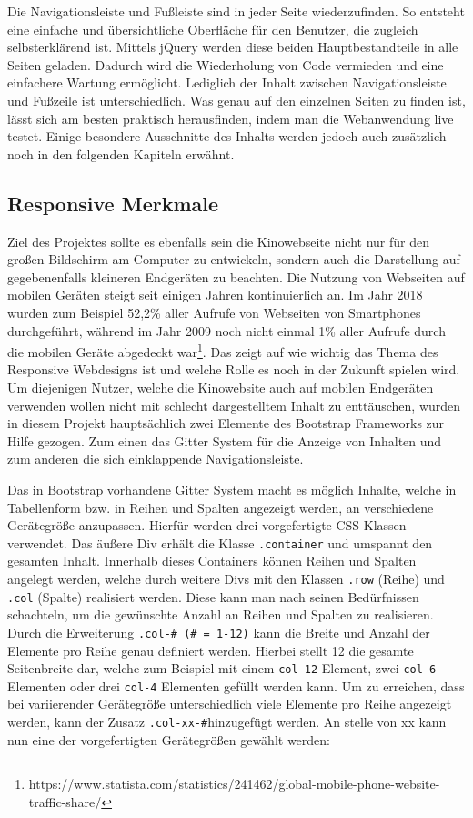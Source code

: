 	    
	    Die Navigationsleiste und Fußleiste sind in jeder Seite wiederzufinden. So entsteht eine einfache und übersichtliche Oberfläche für den Benutzer, die zugleich selbsterklärend ist. Mittels jQuery werden diese beiden Hauptbestandteile in alle Seiten geladen. Dadurch wird die Wiederholung von Code vermieden und eine einfachere Wartung ermöglicht. Lediglich der Inhalt zwischen Navigationsleiste und Fußzeile ist unterschiedlich. Was genau auf den einzelnen Seiten zu finden ist, lässt sich am besten praktisch herausfinden, indem man die Webanwendung live testet. Einige besondere Ausschnitte des Inhalts werden jedoch auch zusätzlich noch in den folgenden Kapiteln erwähnt. 
	
	
	\subsection{Responsive Merkmale}
	Ziel des Projektes sollte es ebenfalls sein die Kinowebseite nicht nur für den großen Bildschirm am Computer zu entwickeln, sondern auch die Darstellung auf gegebenenfalls kleineren Endgeräten zu beachten. Die Nutzung von Webseiten auf mobilen Geräten steigt seit einigen Jahren kontinuierlich an. Im Jahr 2018 wurden zum Beispiel 52,2\% aller Aufrufe von Webseiten von Smartphones durchgeführt, während im Jahr 2009 noch nicht einmal 1\% aller Aufrufe durch die mobilen Geräte abgedeckt war\footnote{https://www.statista.com/statistics/241462/global-mobile-phone-website-traffic-share/}. Das zeigt auf wie wichtig das Thema des Responsive Webdesigns ist und welche Rolle es noch in der Zukunft spielen wird. Um diejenigen Nutzer, welche die Kinowebsite auch auf mobilen Endgeräten verwenden wollen nicht mit schlecht dargestelltem Inhalt zu enttäuschen, wurden in diesem Projekt hauptsächlich zwei Elemente des Bootstrap Frameworks zur Hilfe gezogen. Zum einen das Gitter System für die Anzeige von Inhalten und zum anderen die sich einklappende Navigationsleiste.
	
	Das in Bootstrap vorhandene Gitter System macht es möglich Inhalte, welche in Tabellenform bzw. in Reihen und Spalten angezeigt werden, an verschiedene Gerätegröße anzupassen. Hierfür werden drei vorgefertigte \acs{CSS}-Klassen verwendet. Das äußere Div erhält die Klasse \texttt{.container} und umspannt den gesamten Inhalt. Innerhalb dieses Containers können Reihen und Spalten angelegt werden, welche durch weitere Divs mit den Klassen \texttt{.row} (Reihe) und \texttt{.col} (Spalte) realisiert werden. Diese kann man nach seinen Bedürfnissen schachteln, um die gewünschte Anzahl an Reihen und Spalten zu realisieren. Durch die Erweiterung \texttt{.col-\# (\# = 1-12)} kann die Breite und Anzahl der Elemente pro Reihe genau definiert werden. Hierbei stellt 12 die gesamte Seitenbreite dar, welche zum Beispiel mit einem 
	\texttt{col-12}  Element, zwei \texttt{col-6} Elementen oder drei \texttt{col-4} Elementen gefüllt werden kann. Um zu erreichen, dass bei variierender Gerätegröße unterschiedlich viele Elemente pro Reihe angezeigt werden, kann der Zusatz \texttt{.col-xx-\#}hinzugefügt werden. An stelle von xx kann nun eine der vorgefertigten Gerätegrößen gewählt werden:
	
